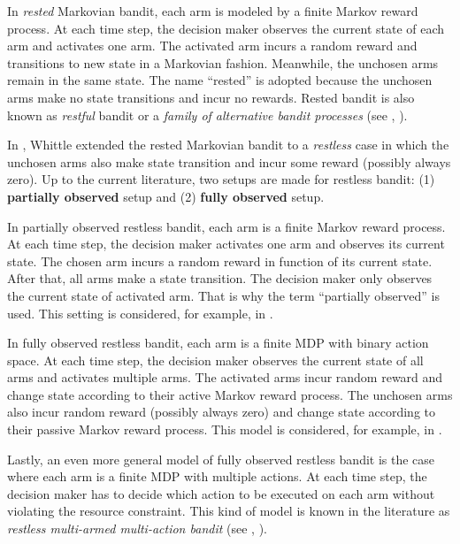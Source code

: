 In \emph{rested} Markovian bandit, each arm is modeled by a finite Markov reward process. At each time step, the decision maker observes the current state of each arm and activates one arm.
The activated arm incurs a random reward and transitions to new state in a Markovian fashion.
Meanwhile, the unchosen arms remain in the same state.
The name ``rested'' is adopted because the unchosen arms make no state transitions and incur no rewards.
Rested bandit is also known as \emph{restful} bandit or a \emph{family of alternative bandit processes} (see \eg, \cite{gittins1979bandit,katehakis1987multi,duff1995q,tekin2010online,gittins2011multi}).

In \cite{whittle1988restless}, Whittle extended the rested Markovian bandit to a \emph{restless} case in which
the unchosen arms also make state transition and incur some reward (possibly always zero).
Up to the current literature, two setups are made for restless bandit: (1) \textbf{partially observed} setup and (2) \textbf{fully observed} setup.

In partially observed restless bandit, each arm is a finite Markov reward process.
At each time step, the decision maker activates one arm and observes its current state.
The chosen arm incurs a random reward in function of its current state.
After that, all arms make a state transition.
The decision maker only observes the current state of activated arm.
That is why the term ``partially observed'' is used.
This setting is considered, for example, in \cite{ahmad2009multi,ortner2012regret, jung2019regret, akbarzadeh2019dynamic, wang2020restless}.

In fully observed restless bandit, each arm is a finite MDP with binary action space.
At each time step, the decision maker observes the current state of all arms and activates multiple arms.
The activated arms incur random reward and change state according to their active Markov reward process.
The unchosen arms also incur random reward (possibly always zero) and change state according to their passive Markov reward process.
This model is considered, for example, in \cite{whittle1996optimal,akbarzadeh2019restless,gast2020exponential,dahiya2022scalable}.

Lastly, an even more general model of fully observed restless bandit is the case where each arm is a finite MDP with multiple actions.
At each time step, the decision maker has to decide which action to be executed on each arm without violating the resource constraint.
This kind of model is known in the literature as \emph{restless multi-armed multi-action bandit} (see \eg, \cite{hodge2015asymptotic,killian2021beyond}).

